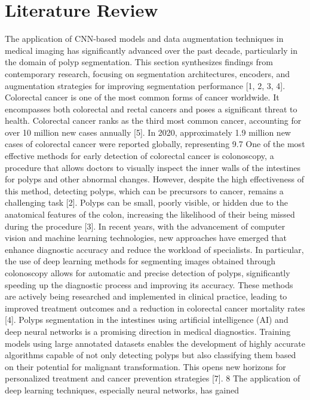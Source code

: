 \chapter{Literature Review}

The application of CNN-based models and data augmentation techniques in medical imaging has significantly advanced over the past decade, particularly in the domain of polyp
segmentation. This section synthesizes findings from contemporary research, focusing on
segmentation architectures, encoders, and augmentation strategies for improving segmentation performance [1, 2, 3, 4].
Colorectal cancer is one of the most common forms of cancer worldwide. It encompasses both colorectal and rectal cancers and poses a significant threat to health.
Colorectal cancer ranks as the third most common cancer, accounting for over 10 million
new cases annually [5]. In 2020, approximately 1.9 million new cases of colorectal cancer
were reported globally, representing 9.7%
One of the most effective methods for early detection of colorectal cancer is colonoscopy,
a procedure that allows doctors to visually inspect the inner walls of the intestines for
polyps and other abnormal changes. However, despite the high effectiveness of this method,
detecting polyps, which can be precursors to cancer, remains a challenging task [2]. Polyps
can be small, poorly visible, or hidden due to the anatomical features of the colon, increasing the likelihood of their being missed during the procedure [3].
In recent years, with the advancement of computer vision and machine learning
technologies, new approaches have emerged that enhance diagnostic accuracy and reduce
the workload of specialists. In particular, the use of deep learning methods for segmenting
images obtained through colonoscopy allows for automatic and precise detection of polyps,
significantly speeding up the diagnostic process and improving its accuracy. These methods
are actively being researched and implemented in clinical practice, leading to improved
treatment outcomes and a reduction in colorectal cancer mortality rates [4].
Polyps segmentation in the intestines using artificial intelligence (AI) and deep
neural networks is a promising direction in medical diagnostics. Training models using
large annotated datasets enables the development of highly accurate algorithms capable of
not only detecting polyps but also classifying them based on their potential for malignant
transformation. This opens new horizons for personalized treatment and cancer prevention
strategies [7].
8
The application of deep learning techniques, especially neural networks, has gained
